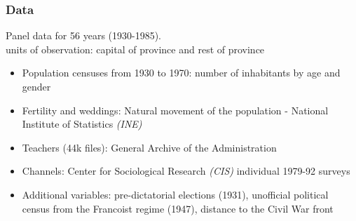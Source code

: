 \documentclass[aspectratio=169]{beamer}
\begin{document}



\begin{frame}[label=databack]
 \frametitle{Data }

Panel data for 56 years (1930-1985).
\\\pause
{} units of observation: capital of province and rest of province
\pause
\medskip
\begin{itemize}


\footnotesize
\item {\color{blue}Population} censuses from 1930 to 1970: number of inhabitants by age and gender
\medskip
\item {\color{blue}Fertility and weddings}: Natural movement of the population - National  Institute of Statistics \textit{(INE)}  %
\medskip
\pause
\item {\color{blue}Teachers} %
(44k files): General Archive of the Administration \hyperlink{histogram_teachers}{} 
\hyperlink{cleansed}{} \hyperlink{map_teachers}{} 
\medskip
\pause

\item {\color{blue}Channels:} Center for Sociological Research \textit{(CIS)} individual 1979-92 surveys
\medskip
\pause

\item {\color{blue}Additional variables:} pre-dictatorial elections (1931), unofficial political census from the Francoist regime (1947), distance to the Civil War front
\end{itemize}

\end{frame}
\end{document}
